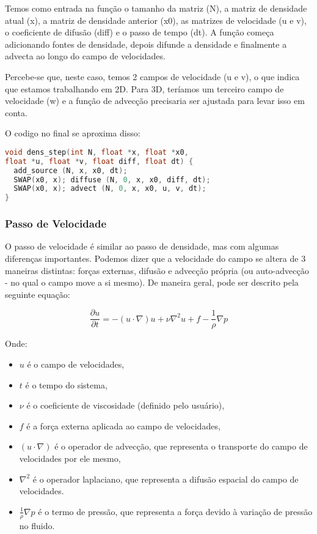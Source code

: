 Temos como entrada na função o tamanho da matriz (N), a matriz de densidade atual (x), a matriz de densidade anterior (x0), as matrizes de velocidade (u e v), o coeficiente de difusão (diff) e o passo de tempo (dt). A função começa adicionando fontes de densidade, depois difunde a densidade e finalmente a advecta ao longo do campo de velocidades.

Percebe-se que, neste caso, temos 2 campos de velocidade (u e v), o que indica que estamos trabalhando em 2D. Para 3D, teríamos um terceiro campo de velocidade (w) e a função de advecção precisaria ser ajustada para levar isso em conta.

O codigo no final se aproxima disso:
\begin{lstlisting}[language=C]
void dens_step(int N, float *x, float *x0, 
float *u, float *v, float diff, float dt) {
  add_source (N, x, x0, dt);
  SWAP(x0, x); diffuse (N, 0, x, x0, diff, dt);
  SWAP(x0, x); advect (N, 0, x, x0, u, v, dt);
}
\end{lstlisting}


\subsubsection*{Passo de Velocidade}
O passo de velocidade é similar ao passo de densidade, mas com algumas diferenças importantes. Podemos dizer que a velocidade do campo se altera de 3 maneiras distintas: forças externas, difusão e advecção própria (ou auto-advecção - no qual o campo move a si mesmo). De maneira geral, pode ser descrito pela seguinte equação:

$$\frac{\partial u}{\partial t} = - (u \cdot \nabla) u + \nu \nabla^2 u + f - \frac{1}{\rho} \nabla p$$

Onde:
\begin{itemize}
  \item $u$ é o campo de velocidades,
  \item $t$ é o tempo do sistema,
  \item $\nu$ é o coeficiente de viscosidade (definido pelo usuário),
  \item $f$ é a força externa aplicada ao campo de velocidades,
  \item $(u \cdot \nabla)$ é o operador de advecção, que representa o transporte do campo de velocidades por ele mesmo,
  \item $\nabla^2$ é o operador laplaciano, que representa a difusão espacial do campo de velocidades.
  \item $\frac{1}{\rho} \nabla p$ é o termo de pressão, que representa a força devido à variação de pressão no fluido.
\end{itemize}

